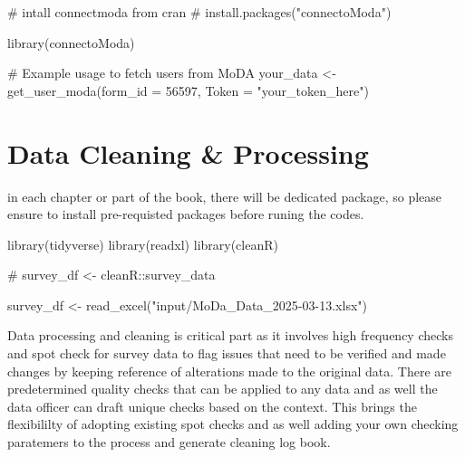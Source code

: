 \documentclass[
  letterpaper,
  DIV=11,
  numbers=noendperiod]{scrreprt}
\newenvironment{Shaded}{\begin{snugshade}}{\end{snugshade}}
\newcommand{\AttributeTok}[1]{\textcolor[rgb]{0.40,0.45,0.13}{#1}}
\newcommand{\CommentTok}[1]{\textcolor[rgb]{0.37,0.37,0.37}{#1}}
\newcommand{\DecValTok}[1]{\textcolor[rgb]{0.68,0.00,0.00}{#1}}
\newcommand{\FunctionTok}[1]{\textcolor[rgb]{0.28,0.35,0.67}{#1}}
\newcommand{\NormalTok}[1]{\textcolor[rgb]{0.00,0.23,0.31}{#1}}
\newcommand{\OtherTok}[1]{\textcolor[rgb]{0.00,0.23,0.31}{#1}}
\newcommand{\StringTok}[1]{\textcolor[rgb]{0.13,0.47,0.30}{#1}}
\begin{document}
\begin{Shaded}
\begin{Highlighting}[]
\CommentTok{\# intall connectmoda from cran}
\CommentTok{\# install.packages("connectoModa")}

\FunctionTok{library}\NormalTok{(connectoModa)}

\CommentTok{\# Example usage to fetch users from MoDA}
\NormalTok{your\_data }\OtherTok{\textless{}{-}} \FunctionTok{get\_user\_moda}\NormalTok{(}\AttributeTok{form\_id =} \DecValTok{56597}\NormalTok{, }\AttributeTok{Token =} \StringTok{"your\_token\_here"}\NormalTok{)}
\end{Highlighting}
\end{Shaded}


\hypertarget{data-cleaning-processing}{%
\chapter{Data Cleaning \& Processing}\label{data-cleaning-processing}}

in each chapter or part of the book, there will be dedicated package, so
please ensure to install pre-requisted packages before runing the codes.

\begin{Shaded}
\begin{Highlighting}[]
\FunctionTok{library}\NormalTok{(tidyverse)}
\FunctionTok{library}\NormalTok{(readxl)}
\FunctionTok{library}\NormalTok{(cleanR)}

\CommentTok{\# survey\_df \textless{}{-} cleanR::survey\_data}

\NormalTok{survey\_df }\OtherTok{\textless{}{-}} \FunctionTok{read\_excel}\NormalTok{(}\StringTok{"input/MoDa\_Data\_2025{-}03{-}13.xlsx"}\NormalTok{)}
\end{Highlighting}
\end{Shaded}

Data processing and cleaning is critical part as it involves high
frequency checks and spot check for survey data to flag issues that need
to be verified and made changes by keeping reference of alterations made
to the original data. There are predetermined quality checks that can be
applied to any data and as well the data officer can draft unique checks
based on the context. This brings the flexibililty of adopting existing
spot checks and as well adding your own checking paratemers to the
process and generate cleaning log book.
\end{document}
